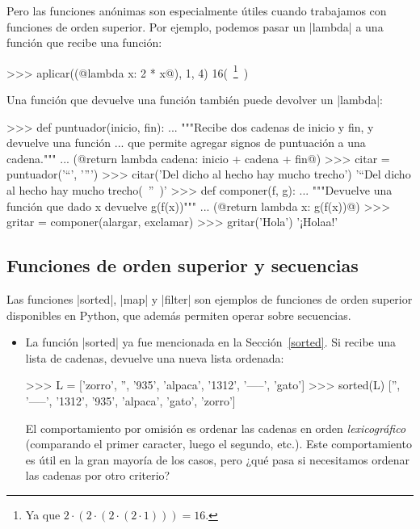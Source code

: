 \begin{subappendices}
Pero las funciones anónimas son especialmente útiles cuando trabajamos con
funciones de orden superior. Por ejemplo, podemos pasar un |lambda| a una
función que recibe una función:

\begin{codigo-python-sn}
>>> aplicar((@lambda x: 2 * x@), 1, 4)
16(~\footnote{Ya que $2 \cdot (2 \cdot (2 \cdot (2 \cdot 1))) = 16$.}~)
\end{codigo-python-sn}

Una función que devuelve una función también puede devolver un |lambda|:

\begin{codigo-python-sn}
>>> def puntuador(inicio, fin):
...    """Recibe dos cadenas de inicio y fin, y devuelve una función
...       que permite agregar signos de puntuación a una cadena."""
...    (@return lambda cadena: inicio + cadena + fin@)
>>> citar = puntuador('“', '”')
>>> citar('Del dicho al hecho hay mucho trecho')
'“Del dicho al hecho hay mucho trecho(~”~)'
>>> def componer(f, g):
...     """Devuelve una función que dado x devuelve g(f(x))"""
...     (@return lambda x: g(f(x))@)
>>> gritar = componer(alargar, exclamar)
>>> gritar('Hola')
'¡Holaa!'
\end{codigo-python-sn}

\subsection*{Funciones de orden superior y secuencias}

Las funciones |sorted|, |map| y |filter| son ejemplos de funciones de orden superior
disponibles en Python, que además permiten operar sobre secuencias.

\begin{itemize}

\item
La función |sorted| ya fue mencionada en la Sección~\ref{sorted}. Si recibe una
lista de cadenas, devuelve una nueva lista ordenada:

\begin{codigo-python-sn}
>>> L = ['zorro', '', '935', 'alpaca', '1312', '-----', 'gato']
>>> sorted(L)
['', '-----', '1312', '935', 'alpaca', 'gato', 'zorro']
\end{codigo-python-sn}

El comportamiento por omisión es ordenar las cadenas en orden \emph{lexicográfico}
(comparando el primer caracter, luego el segundo, etc.). Este comportamiento es
útil en la gran mayoría de los casos, pero ¿qué pasa si necesitamos ordenar las
cadenas por otro criterio?


\end{itemize}
\end{subappendices}
